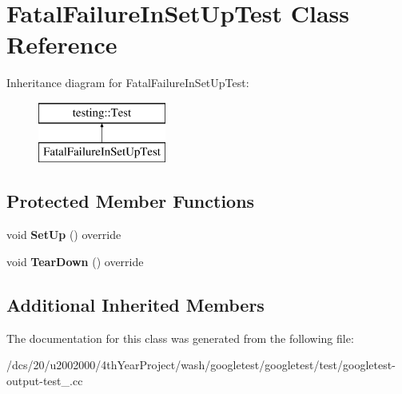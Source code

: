 \hypertarget{classFatalFailureInSetUpTest}{}\section{Fatal\+Failure\+In\+Set\+Up\+Test Class Reference}
\label{classFatalFailureInSetUpTest}
Inheritance diagram for Fatal\+Failure\+In\+Set\+Up\+Test\+:\begin{figure}[H]
\begin{center}
\leavevmode
\includegraphics[height=2.000000cm]{classFatalFailureInSetUpTest}
\end{center}
\end{figure}
\subsection*{Protected Member Functions}
\begin{DoxyCompactItemize}
\item 
\mbox{\label{classFatalFailureInSetUpTest_acaee8e6db4d744f0a98aa6f2e399df3a}} 
void {\bfseries Set\+Up} () override
\item 
\mbox{\label{classFatalFailureInSetUpTest_af5aeffabb2d3d92169b26a14883b4c26}} 
void {\bfseries Tear\+Down} () override
\end{DoxyCompactItemize}
\subsection*{Additional Inherited Members}


The documentation for this class was generated from the following file\+:\begin{DoxyCompactItemize}
\item 
/dcs/20/u2002000/4th\+Year\+Project/wash/googletest/googletest/test/googletest-\/output-\/test\+\_\+.\+cc\end{DoxyCompactItemize}
